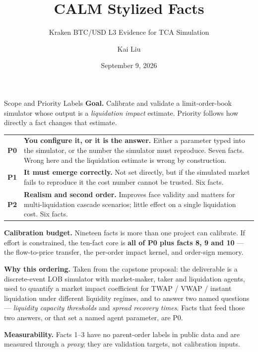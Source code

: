 \documentclass[aspectratio=169,10pt]{beamer}
\title[CALM Stylized Facts]{CALM Stylized Facts}
\subtitle{Kraken BTC/USD L3 Evidence for TCA Simulation}
\author{Kai Liu}
\date{September 9, 2026}
\begin{document}
\begin{frame}[plain]
  \titlepage
\end{frame}
\begin{frame}{Scope and Priority Labels}
\footnotesize
\textbf{Goal.} Calibrate and validate a limit-order-book simulator whose output is a
\emph{liquidation impact} estimate. Priority follows how directly a fact changes that estimate.

\medskip
\begin{tabularx}{\textwidth}{@{}p{1.1cm}X@{}}
\toprule
\textbf{P0} & \textbf{You configure it, or it is the answer.} Either a parameter typed into the
simulator, or the number the simulator must reproduce. Seven facts. Wrong here and the liquidation
estimate is wrong by construction. \\[2pt]
\textbf{P1} & \textbf{It must emerge correctly.} Not set directly, but if the simulated market fails
to reproduce it the cost number cannot be trusted. Six facts. \\[2pt]
\textbf{P2} & \textbf{Realism and second order.} Improves face validity and matters for
multi-liquidation cascade scenarios; little effect on a single liquidation cost. Six facts. \\
\bottomrule
\end{tabularx}

\medskip
\textbf{Calibration budget.} Nineteen facts is more than one project can calibrate. If effort is
constrained, the ten-fact core is \textbf{all of P0 plus facts 8, 9 and 10} --- the flow-to-price
transfer, the per-order impact kernel, and order-sign memory.

\medskip
\textbf{Why this ordering.} Taken from the capstone proposal: the deliverable is a discrete-event
LOB simulator with market-maker, taker and liquidation agents, used to quantify a market impact
coefficient for TWAP / VWAP / instant liquidation under different liquidity regimes, and to answer
two named questions --- \emph{liquidity capacity thresholds} and \emph{spread recovery times}.
Facts that feed those two answers, or that set a named agent parameter, are P0.

\medskip
\textbf{Measurability.} Facts 1--3 have no parent-order labels in public data and are measured
through a \emph{proxy}; they are validation targets, not calibration inputs.
\end{frame}
\end{document}
